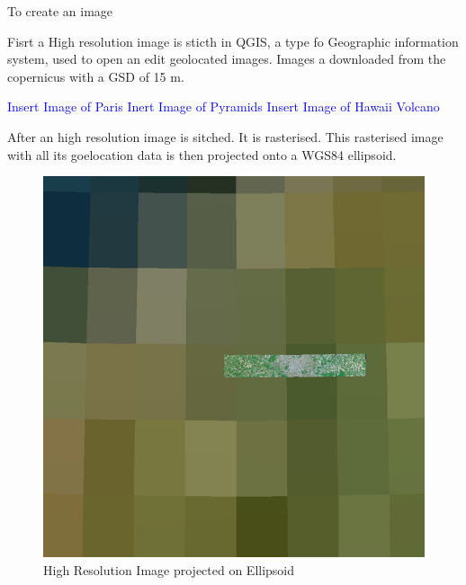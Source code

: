 



\label{sec:imgmesurement}



To create an image

Fisrt a High resolution image is sticth in QGIS, a type fo Geographic information system, used to open an edit geolocated images.
Images a downloaded from the copernicus with a GSD of 15 m.

\textcolor{blue}{Insert Image of Paris}
\textcolor{blue}{Inert Image of Pyramids}
\textcolor{blue}{Insert Image of Hawaii Volcano}

After an high resolution image is sitched. It is rasterised.
This rasterised image with all its goelocation data is then projected onto a WGS84 ellipsoid.

\begin{figure}[H]
    \centering
    \includegraphics[width=0.5\linewidth]{figures/imageprocessing/HighResImage.png}
    \caption{High Resolution Image projected on Ellipsoid}
    \label{}
\end{figure}

